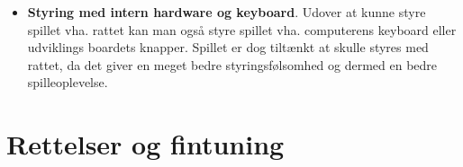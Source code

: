 \begin{itemize}
Først lavede vi lineær model for rattet, men det viste sig hurtigt at den ikke var lineær, derfor lavede vi blot inddelingen manuelt vha. en række if-sætning.

Den samlede koden til Gameport adapteren kan ses i  i appendiks.

Et pinout til Gameport'en samt dybere forklaring kan ses på følgende side \footnote{\url{http://pinouts.ru/Inputs/GameportPC_pinout.shtml}} .

Figur \ref{fig:board_overview} nedenfor viser hvordan Gameport adapteren er forbundet til udviklingsboardet.

\begin{figure}[h!]
\centering
\texttt{[image: figs/board\_overview\_crop.png]}
\caption{Billede af Gameport adapteren forbundet til udviklings boardet}
\label{fig:board_overview}
\end{figure}

\item \textbf{Styring med intern hardware og keyboard}. Udover at kunne styre spillet vha. rattet kan man også styre spillet vha. computerens keyboard eller udviklings boardets knapper. Spillet er dog tiltænkt at skulle styres med rattet, da det giver en meget bedre styringsfølsomhed og dermed en bedre spilleoplevelse.

\end{itemize}

\section{Rettelser og fintuning}

